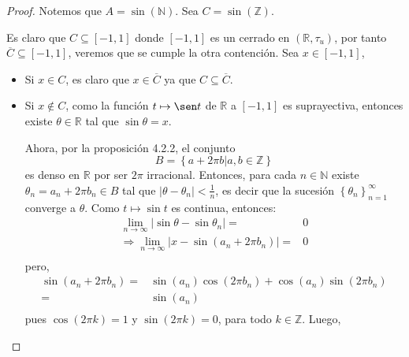 \documentclass[12pt]{report}
\theoremstyle{largebreak}
\newcommand\abs[1]{\ensuremath{\big|#1\big|}}
\newcommand{\Cls}[1]{\ensuremath{\overline{#1}}}
\begin{document}
    \begin{proof}
        Notemos que $A=\sin(\mathbb{N})$. Sea $C=\sin(\mathbb{Z})$.

        Es claro que $C\subseteq[-1,1]$ donde $[-1,1]$ es un cerrado en $(\mathbb{R},\tau_u)$, por tanto $\Cls{C}\subseteq[-1,1]$, veremos que se cumple la otra contención. Sea $x\in[-1,1]$,
        \begin{itemize}
            \item Si $x\in C$,  es claro que $x\in\Cls{C}$ ya que $C\subseteq\Cls{C}$.
            \item Si $x\notin C$, como la función $t\mapsto\sen t$ de $\mathbb{R}$ a $[-1,1]$ es suprayectiva, entonces existe $\theta\in\mathbb{R}$ tal que $\sin\theta=x$.
            
            Ahora, por la proposición 4.2.2, el conjunto
            \begin{equation*}
                B=\left\{a+2\pi b\Big|a,b\in\mathbb{Z} \right\}
            \end{equation*}
            es denso en $\mathbb{R}$ por ser $2\pi$ irracional. Entonces, para cada $n\in\mathbb{N}$ existe $\theta_n=a_n+2\pi b_n\in B$ tal que $\abs{\theta-\theta_n}<\frac{1}{n}$, es decir que la sucesión $\left\{\theta_n \right\}_{n=1}^\infty$ converge a $\theta$. Como $t\mapsto\sin t$ es continua, entonces:
            \begin{equation*}
                \begin{split}
                    \lim_{n\rightarrow\infty }\abs{\sin\theta-\sin\theta_n}=&0\\
                    \Rightarrow \lim_{n\rightarrow\infty }\abs{x-\sin\left(a_n+2\pi b_n \right)}=&0\\
                \end{split}
            \end{equation*}
            pero,
            \begin{equation*}
                \begin{split}
                    \sin\left(a_n+2\pi b_n \right)=&\sin\left(a_n\right)\cos\left(2\pi b_n\right)+\cos\left(a_n\right)\sin\left(2\pi b_n \right)\\
                    =&\sin\left(a_n\right)\\
                \end{split}
            \end{equation*}
            pues $\cos(2\pi k)=1$ y $\sin(2\pi k)=0$, para todo $k\in\mathbb{Z}$. Luego,
            \begin{equation*}

\end{equation*}
\end{itemize}
\end{proof}
\end{document}
